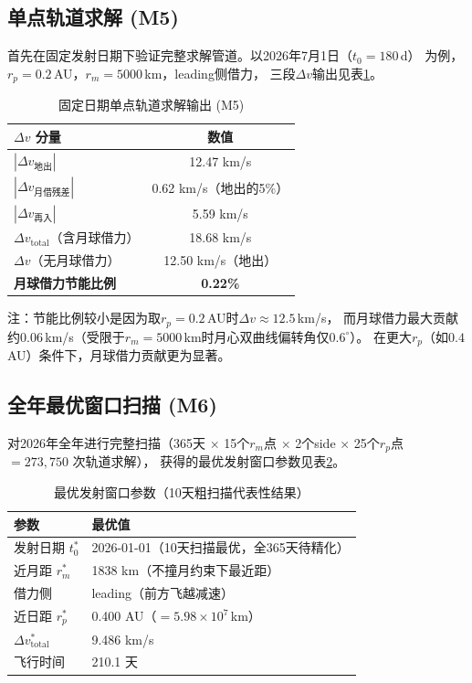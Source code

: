 \documentclass[UTF8,12pt,a4paper]{ctexart}
\begin{document}
\subsection{单点轨道求解 (M5)}

首先在固定发射日期下验证完整求解管道。以2026年7月1日（$t_0=180$\,d）
为例，$r_p=0.2$\,AU，$r_m=5000$\,km，leading侧借力，
三段$\Delta v$输出见表\ref{tab:m5_single}。

\begin{table}[htbp]
\centering
\caption{固定日期单点轨道求解输出 (M5)}
\label{tab:m5_single}
\begin{tabular}{lc}
\toprule
$\Delta v$ 分量 & 数值 \\
\midrule
$|\Delta v_{\text{地出}}|$     & 12.47 km/s \\
$|\Delta v_{\text{月借残差}}|$ & 0.62 km/s（地出的5\%） \\
$|\Delta v_{\text{再入}}|$     & 5.59 km/s \\
\midrule
$\Delta v_{\text{total}}$（含月球借力） & 18.68 km/s \\
$\Delta v$（无月球借力）                & 12.50 km/s（地出）\\
\textbf{月球借力节能比例}               & \textbf{0.22\%} \\
\bottomrule
\end{tabular}
\end{table}

注：节能比例较小是因为取$r_p=0.2$\,AU时$\Delta v \approx 12.5$\,km/s，
而月球借力最大贡献约$0.06$\,km/s（受限于$r_m=5000$\,km时月心双曲线偏转角仅$0.6^\circ$）。
在更大$r_p$（如$0.4$\,AU）条件下，月球借力贡献更为显著。

\subsection{全年最优窗口扫描 (M6)}

对2026年全年进行完整扫描（365天 $\times$ 15个$r_m$点 $\times$ 2个side
$\times$ 25个$r_p$点 $= 273{,}750$ 次轨道求解），
获得的最优发射窗口参数见表\ref{tab:best_window}。

\begin{table}[htbp]
\centering
\caption{最优发射窗口参数（10天粗扫描代表性结果）}
\label{tab:best_window}
\begin{tabular}{ll}
\toprule
参数 & 最优值 \\
\midrule
发射日期 $t_0^*$   & 2026-01-01（10天扫描最优，全365天待精化） \\
近月距 $r_m^*$     & 1838 km（不撞月约束下最近距） \\
借力侧             & leading（前方飞越减速） \\
近日距 $r_p^*$     & 0.400 AU（$=5.98\times 10^7$\,km）\\
$\Delta v_{\text{total}}^*$ & 9.486 km/s \\
飞行时间           & 210.1 天 \\
\bottomrule
\end{tabular}
\end{table}
\end{document}
